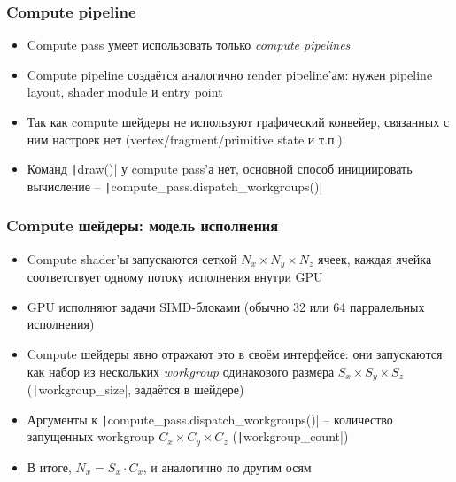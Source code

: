 \documentclass[10pt]{beamer}
\begin{document}
\begin{frame}[fragile]
\frametitle{Compute pipeline}
\begin{itemize}
\item Compute pass умеет использовать только \textit{compute pipelines}
\pause
\item Compute pipeline создаётся аналогично render pipeline'ам: нужен pipeline layout, shader module и entry point
\pause
\item Так как compute шейдеры не используют графический конвейер, связанных с ним настроек нет (vertex/fragment/primitive state и т.п.)
\pause
\item Команд \texttt|draw()| у compute pass'а нет, основной способ инициировать вычисление -- \texttt|compute_pass.dispatch_workgroups()|
\end{itemize}
\end{frame}

\begin{frame}[fragile]
\frametitle{Compute шейдеры: модель исполнения}
\begin{itemize}
\item Compute shader'ы запускаются сеткой \(N_x\times N_y\times N_z\) ячеек, каждая ячейка соответствует одному потоку исполнения внутри GPU
\pause
\item GPU исполняют задачи SIMD-блоками (обычно 32 или 64 парралельных исполнения)
\pause
\item Compute шейдеры явно отражают это в своём интерфейсе: они запускаются как набор из нескольких \textit{workgroup} одинакового размера \(S_x\times S_y\times S_z\) (\texttt|workgroup_size|, задаётся в шейдере)
\pause
\item Аргументы к \texttt|compute_pass.dispatch_workgroups()| -- количество запущенных workgroup \(C_x\times C_y\times C_z\) (\texttt|workgroup_count|)
\pause
\item В итоге, \(N_x = S_x \cdot C_x\), и аналогично по другим осям
\end{itemize}
\end{frame}
\end{document}
